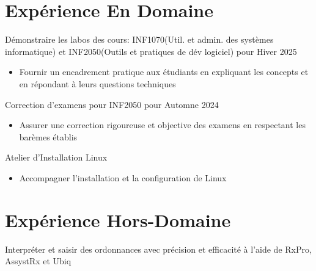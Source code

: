 \documentclass[letterpaper,10pt]{article}
\begin{document}

  \section{Expérience En Domaine}

  \begin{resume_list}
    \item Démonstraire les labos des cours: INF1070(Util. et admin. des systèmes informatique) et INF2050(Outils et pratiques de dév logiciel) pour Hiver 2025
    \begin{itemize}
    \item{Fournir un encadrement pratique aux étudiants en expliquant les concepts et en répondant à leurs questions techniques}
    \end{itemize}
    \vspace{3pt}
    \item Correction d'examens pour INF2050 pour Automne 2024
    \begin{itemize}
    \item{Assurer une correction rigoureuse et objective des examens en respectant les barèmes établis}
    \end{itemize}
    \item Atelier d'Installation Linux
    \begin{itemize}
    \item{Accompagner l'installation et la configuration de Linux}
    \end{itemize}
  \end{resume_list}

   \section{Expérience Hors-Domaine}

  \begin{resume_list}
    \item Interpréter et saisir des ordonnances avec précision et efficacité à l'aide de RxPro, AssystRx et Ubiq
  \end{resume_list}
\end{document}
